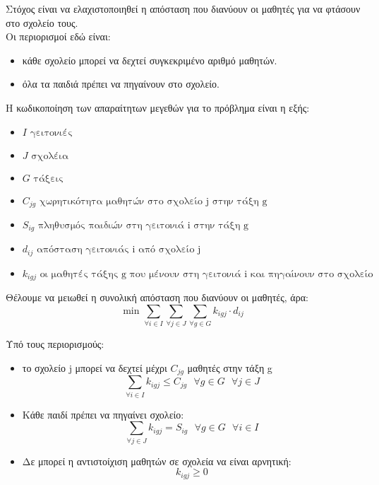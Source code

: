 \documentclass[12pt]{article}
\begin{document}
Στόχος είναι να ελαχιστοποιηθεί η απόσταση που διανύουν οι μαθητές για να φτάσουν στο σχολείο τους. \\

Οι περιορισμοί εδώ είναι:

\begin{itemize}
    \item κάθε σχολείο μπορεί να δεχτεί συγκεκριμένο αριθμό μαθητών.
    \item όλα τα παιδιά πρέπει να πηγαίνουν στο σχολείο.
\end{itemize}


Η κωδικοποίηση των απαραίτητων μεγεθών για το πρόβλημα είναι η εξής:

\begin{itemize}
    \item \( I \mbox{ γειτονιές}\)
    \item \( J \mbox{ σχολέια}\)
    \item \( G \mbox{ τάξεις}\)
    \item \( C_{jg} \mbox{ χωρητικότητα μαθητών στο σχολείο j στην τάξη g}\)
    \item \( S_{ig} \mbox{ πληθυσμός παιδιών στη γειτονιά i στην τάξη g}\)
    \item \( d_{ij} \mbox{ απόσταση γειτονιάς i από σχολείο j}\)
    \item \( k_{igj} \mbox{ οι μαθητές τάξης g που μένουν στη γειτονιά i και πηγαίνουν στο σχολείο j}\)
\end{itemize}

Θέλουμε να μειωθεί η συνολική απόσταση που διανύουν οι μαθητές, άρα: \\
\[ \mbox{min } \sum_{\forall i \in I}{ \sum_{\forall j \in J} { \sum_{\forall g \in G} {k_{igj} \cdot d_{ij} } }  }     \]

Υπό τους περιορισμούς:

\begin{itemize}
    \item το σχολείο j μπορεί να δεχτεί μέχρι \( C_{jg} \) μαθητές στην τάξη g
    \[  \sum_{\forall i \in I}{ k_{igj} \leq C_{jg} } \mbox{ } \forall g \in G \mbox{ } \forall j \in J   \]
    \item Κάθε παιδί πρέπει να πηγαίνει σχολείο:
    \[  \sum_{\forall j \in J}{ k_{igj} = S_{ig} } \mbox{ } \forall g \in G \mbox{ } \forall i \in I   \]
    \item Δε μπορεί η αντιστοίχιση μαθητών σε σχολεία να είναι αρνητική:
    \[  k_{igj} \geq 0  \]
\end{itemize}
\end{document}
